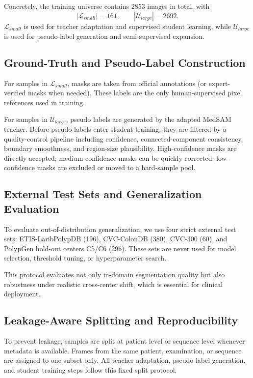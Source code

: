 ﻿\documentclass[11pt]{article}
\begin{document}
Concretely, the training universe contains 2853 images in total, with
\begin{equation}
|\mathcal{L}_{small}| = 161, \qquad |\mathcal{U}_{large}| = 2692.
\end{equation}
$\mathcal{L}_{small}$ is used for teacher adaptation and supervised student learning, while $\mathcal{U}_{large}$ is used for pseudo-label generation and semi-supervised expansion.

\subsection{Ground-Truth and Pseudo-Label Construction}
For samples in $\mathcal{L}_{small}$, masks are taken from official annotations (or expert-verified masks when needed). These labels are the only human-supervised pixel references used in training.

For samples in $\mathcal{U}_{large}$, pseudo labels are generated by the adapted MedSAM teacher. Before pseudo labels enter student training, they are filtered by a quality-control pipeline including confidence, connected-component consistency, boundary smoothness, and region-size plausibility. High-confidence masks are directly accepted; medium-confidence masks can be quickly corrected; low-confidence masks are excluded or moved to a hard-sample pool.

\subsection{External Test Sets and Generalization Evaluation}
To evaluate out-of-distribution generalization, we use four strict external test sets: ETIS-LaribPolypDB (196), CVC-ColonDB (380), CVC-300 (60), and PolypGen hold-out centers C5/C6 (296). These sets are never used for model selection, threshold tuning, or hyperparameter search.

This protocol evaluates not only in-domain segmentation quality but also robustness under realistic cross-center shift, which is essential for clinical deployment.

\subsection{Leakage-Aware Splitting and Reproducibility}
To prevent leakage, samples are split at patient level or sequence level whenever metadata is available. Frames from the same patient, examination, or sequence are assigned to one subset only. All teacher adaptation, pseudo-label generation, and student training steps follow this fixed split protocol.
\end{document}
